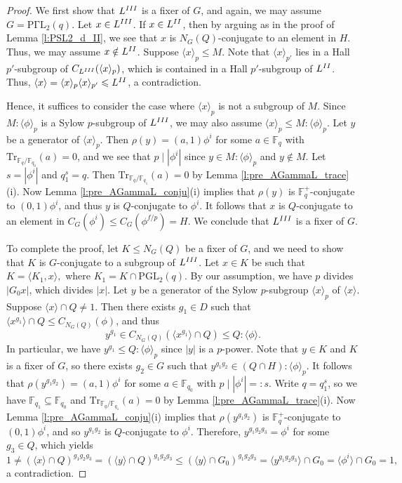 \documentclass[twoside,a4paper,reqno,11pt]{amsart}
\newcommand{\<}{\langle}
\renewcommand{\>}{\rangle}
\newcommand{\la}{\langle}
\newcommand{\ra}{\rangle}
\newcommand{\leqs}{\leqslant}
\newcommand{\PGL}{\mathrm{PGL}}
\newcommand{\PGammaL}{\mathrm{P\Gamma L}}
\newcommand{\Tr}{\mathrm{Tr}}
\theoremstyle{definition}
\begin{document}
	\begin{proof}
		We first show that $L^{\rm III}$ is a fixer of $G$, and again, we may assume $G = \PGammaL_2(q)$. Let $x\in L^{\rm III}$. If $x\in L^{\rm II}$, then by arguing as in the proof of Lemma \ref{l:PSL2_d_II}, we see that $x$ is $N_G(Q)$-conjugate to an element  in $H$. Thus, we may assume $x\notin L^{\rm II}$. Suppose $\la x\ra_p\leqs M$. Note that $\la x\ra_{p'}$ lies in a Hall $p'$-subgroup of $C_{L^{\rm III}}(\la x\ra_p)$, which is contained in a Hall $p'$-subgroup of $L^{\rm II}$. Thus, $\la x\ra = \la x\ra_p\la x\ra_{p'}\leqs L^{\rm II}$, a contradiction.
		
		Hence, it suffices to consider the case where $\la x\ra_p$ is not a subgroup of $M$.
		Since $M{:}\la \phi\ra_p$ is a Sylow $p$-subgroup of $L^{\rm III}$, we may also assume $\la x\ra_p\leqs M{:}\la \phi\ra_p$. Let $y$ be a generator of $\la x\ra_p$. Then $\rho(y) = (a,1)\phi^{i}$ for some $a\in\mathbb{F}_q$ with $\Tr_{\mathbb{F}_q/\mathbb{F}_{q_0}}(a) = 0$, and we see that $p\mid |\phi^i|$ since $y\in M{:}\la \phi\ra_p$ and $y\notin M$. Let $s = |\phi^i|$ and $q_1^s = q$. Then $\Tr_{\mathbb{F}_q/\mathbb{F}_{q_1}}(a) = 0$ by Lemma \ref{l:pre_AGammaL_trace}(i).
		Now Lemma \ref{l:pre_AGammaL_conju}(i) implies that $\rho(y)$ is $\mathbb{F}_q^+$-conjugate to $(0,1)\phi^i$, and thus $y$ is $Q$-conjugate to $\phi^i$. It follows that $x$ is $Q$-conjugate to an element in $C_G(\phi^i)\leqs C_G(\phi^{f/p}) = H$. We conclude that $L^{\rm III}$ is a fixer of $G$.
		
		To complete the proof, let $K\leqs N_G(Q)$ be a fixer of $G$, and we need to show that $K$ is $G$-conjugate to a subgroup of $L^{\rm III}$. Let $x\in K$ be such that $K=\la K_1, x \ra,$ where $K_1=K\cap \PGL_2(q)$.
		By our assumption, we have $p$ divides $|G_0x|$, which divides $|x|$. Let $y$ be a generator of the Sylow $p$-subgroup $\la x\ra_p$ of $\la x\ra$. Suppose $\la x\ra\cap Q\ne 1$. Then there exists $g_1\in D$ such that $\la x^{g_1}\ra\cap Q\leqs C_{N_G(Q)}(\phi)$, and thus
		\begin{equation*}
		y^{g_1}\in C_{N_G(Q)}(\la x^{g_1}\ra\cap Q)\leqs Q{:}\la\phi\ra.
		\end{equation*}
		In particular, we have $y^{g_1}\leqs Q{:}\la\phi\ra_p$ since $|y|$ is a $p$-power. Note that $y\in K$ and $K$ is a fixer of $G$, so there exists $g_2\in G$ such that $y^{g_1g_2}\in (Q\cap H){:}\la\phi\ra_p$. It follows that $\rho(y^{g_1g_2}) = (a,1)\phi^i$ for some $a\in\mathbb{F}_{q_0}$ with $p\mid |\phi^i|=:s$. Write $q = q_1^s$, so we have $\mathbb{F}_{q_1}\subseteq \mathbb{F}_{q_0}$ and $\Tr_{\mathbb{F}_q/\mathbb{F}_{q_1}}(a) = 0$ by Lemma \ref{l:pre_AGammaL_trace}(i). Now Lemma \ref{l:pre_AGammaL_conju}(i) implies that $\rho(y^{g_1g_2})$ is $\mathbb{F}_q^+$-conjugate to $(0,1)\phi^i$, and so $y^{g_1g_2}$ is $Q$-conjugate to $\phi^i$. Therefore, $y^{g_1g_2g_3} = \phi^i$ for some $g_3\in Q$, which yields
		\begin{equation*}
		1\ne (\la x\ra \cap Q)^{g_1g_2g_3} = (\la y\ra \cap Q)^{g_1g_2g_3} \leqs (\la y\ra\cap G_0)^{g_1g_2g_3} = \la y^{g_1g_2g_3}\ra\cap G_0 = \la\phi^i\ra\cap G_0 = 1,
		\end{equation*}
		a contradiction.
		

\end{proof}
\end{document}
